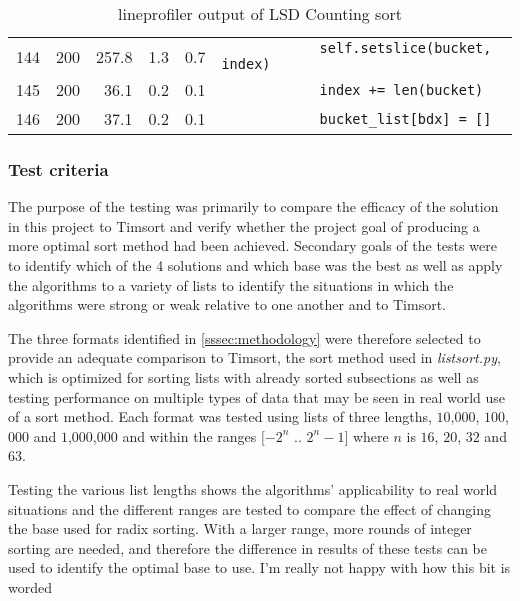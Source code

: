 \documentclass[12pt]{article}
\begin{document}
\begin{table}[H]
{{\begin{tabular}{rrrrrl}
	 144 & 200   & 257.8  & 1.3    & 0.7  &  \;\;\;\;\;\;\;\;\;\;\;\;\lstinline{            self.setslice(bucket, index)}\\
	 145 & 200   & 36.1   & 0.2    & 0.1  &  \;\;\;\;\;\;\;\;\;\;\;\;\lstinline{            index += len(bucket)}\\
	 146 & 200   & 37.1   & 0.2    & 0.1  &  \;\;\;\;\;\;\;\;\;\;\;\;\lstinline{            bucket_list[bdx] = []}\\
	 \hline
		\end{tabular}
		}}
		\caption*{line\textunderscore profiler output of LSD Counting sort}
	\end{table}
	
	\pagebreak
	\subsubsection{Test criteria}
	The purpose of the testing was primarily to compare the efficacy of the solution in this project to Timsort and verify whether the project goal of producing a more optimal sort method had been achieved. Secondary goals of the tests were to identify which of the 4 solutions and which base was the best as well as apply the algorithms to a variety of lists to identify the situations in which the algorithms were strong or weak relative to one another and to Timsort.
	\par
	The three formats identified in \ref{sssec:methodology} were therefore selected to provide an adequate comparison to Timsort, the sort method used in \textit{listsort.py}, which is optimized for sorting lists with already sorted subsections as well as testing performance on multiple types of data that may be seen in real world use of a sort method. Each format was tested using lists of three lengths, $10$,$000$, $100$,$000$ and $1$,$000$,$000$ and within the ranges $[-2^{n}$ $..$ $2^{n}-1]$ where $n$ is $16$, $20$, $32$ and $63$.
	\par
	 Testing the various list lengths shows the algorithms' applicability to real world situations and the different ranges are tested to compare the effect of changing the base used for radix sorting. With a larger range, more rounds of integer sorting are needed, and therefore the difference in results of these tests can be used to identify the optimal base to use. {\color{blue} I'm really not happy with how this bit is worded}
	\par

	\pagebreak
	
\end{document}

